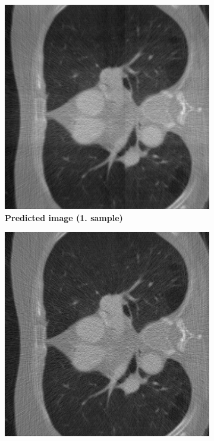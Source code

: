 \documentclass[12pt,a4paper]{article}
\begin{document}
\begin{figure}[h!]
\begin{subfigure}[t]{\size\textwidth}
        \includegraphics[width=\textwidth]{Bachelorthesis/UsedImages/Train1000_L2_100epochs/Training_L2_1000_100epochs_after10/pred_0_train1000l2100.png}
        \caption{\textbf{Predicted image (1. sample)}}
        \label{fig:windowII+l2+slow+subset_learned0}
    \end{subfigure}
    \hfill
    \begin{subfigure}[t]{\size\textwidth}
        \centering
       \includegraphics[width=\textwidth]{Bachelorthesis/UsedImages/Train1000_L2_100epochs/Training_L2_1000_100epochs_after10/vanilla_0_train1000l2100.png}

\end{subfigure}
\end{figure}
\end{document}

